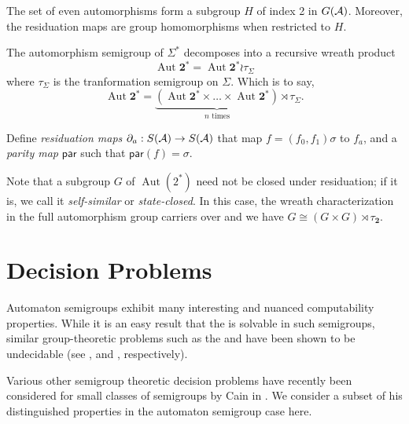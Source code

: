 \documentclass[11pt, titlepage]{article}
\begin{document}
The set of even automorphisms form a subgroup $H$ of index 2 in
$G(\mathcal{A})$. Moreover, the residuation maps are group homomorphisms when
restricted to $H$.

The automorphism semigroup of $\Sigma^*$ decomposes into a recursive
wreath product
\[
  \operatorname{Aut}\textbf{2}^* = \operatorname{Aut}\textbf{2}^* \wr
  \tau_\Sigma
\]
where $\tau_\Sigma$ is the tranformation semigroup on $\Sigma$. Which
is to say,
\[
  \operatorname{Aut}\textbf{2}^* =
  \underbrace{(\operatorname{Aut}\textbf{2}^* \times \ldots \times
    \operatorname{Aut}\textbf{2}^* )}_\text{$n$ times} \rtimes
  \tau_\Sigma.
\]

\begin{definition}
  Define \emph{residuation maps}
  $\partial_a : S(\mathcal{A}) \rightarrow S(\mathcal{A})$ that map
  $f = (f_0, f_1)\sigma$ to $f_a$, and a \emph{parity map}
  $\textsf{par}$ such that $\textsf{par}(f) = \sigma$.
\end{definition}

Note that a subgroup $G$ of $\operatorname{Aut}(2^*)$ need not be
closed under residuation; if it is, we call it \emph{self-similar} or
\emph{state-closed}. In this case, the wreath characterization in the
full automorphism group carriers over and we have
$G \cong (G \times G) \rtimes \tau_{\textbf{2}}$.




\section{Decision Problems}

Automaton semigroups exhibit many interesting and nuanced
computability properties. While it is an easy result that the
 is solvable in such semigroups, similar
group-theoretic problems such as the  and
 have been shown to be undecidable
(see \cite{sunic:conj}, and \cite{gillibert:finite}, respectively).

Various other semigroup theoretic decision problems have recently been
considered for small classes of semigroups by Cain in
\cite{Cain09:dec_prob}. We consider a subset of his distinguished
properties in the automaton semigroup case here.
\end{document}
